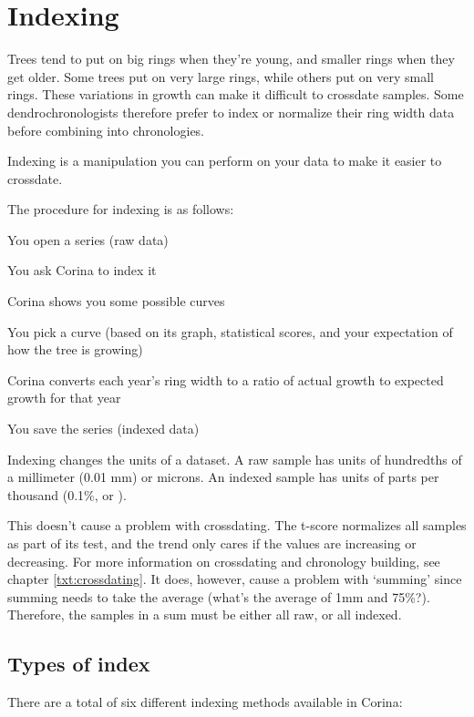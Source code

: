 \chapter{Indexing}

Trees tend to put on big rings when they're young, and smaller rings when they get older. Some trees put on very large rings, while others put on very small rings. These variations in growth can make it difficult to crossdate samples.  Some dendrochronologists therefore prefer to index or normalize their ring width data before combining into chronologies.

Indexing is a manipulation you can perform on your data to make it easier to crossdate.

The procedure for indexing is as follows:

\begin{enumerate*}
   \item You open a series (raw data)
   \item You ask Corina to index it
   \item Corina shows you some possible curves
   \item You pick a curve (based on its graph, statistical scores, and your expectation of how the tree is growing)
   \item Corina converts each year's ring width to a ratio of actual growth to expected growth for that year
   \item You save the series (indexed data) 
\end{enumerate*}

Indexing changes the units of a dataset. A raw sample has units of hundredths of a millimeter (0.01 mm) or microns. An indexed sample has units of parts per thousand (0.1\%, or \textperthousand).

This doesn't cause a problem with crossdating. The t-score normalizes all samples as part of its test, and the trend only cares if the values are increasing or decreasing. For more information on crossdating and chronology building, see chapter \ref{txt:crossdating}.  It does, however, cause a problem with `summing' since summing needs to take the average (what's the average of 1mm and 75\%?). Therefore, the samples in a sum must be either all raw, or all indexed. 

\section{Types of index}

There are a total of six different indexing methods available in Corina:

